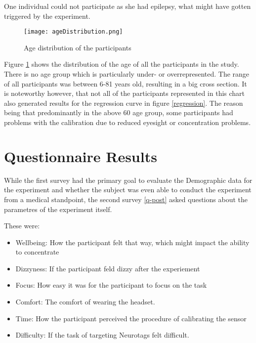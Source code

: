             One individual could not participate as she had epilepsy, what might have gotten triggered by the experiment.

            \begin{figure}[h]     %
                \centering
                \texttt{[image: ageDistribution.png]} 
                \caption{Age distribution of the participants}\label{age-dist}
            \end{figure}

            Figure \ref*{age-dist} shows the distribution of the age of all the participants in the study. There is no age group which is particularly under- or overrepresented. The range of all participants was between 6-81 years old, resulting in a big cross section. It is noteworthy however, that not all of the participants represented in this chart also generated results for the regression curve in figure \ref*{regression}. The reason being that predominantly in the above 60 age group, some participants had problems with the calibration due to reduced eyesight or concentration problems.
     
        \section{Questionnaire Results}

            While the first survey had the primary goal to evaluate the Demographic data for the experiment and whether the subject was even able to conduct the experiment from a medical standpoint, the second survey \ref*{q-post} asked questions about the parametres of the experiment itself.

            These were:

            \begin{itemize}
                \item Wellbeing: How the participant felt that way, which might impact the ability to concentrate
                \item Dizzyness: If the participant feld dizzy after the experiement
                \item Focus: How easy it was for the participant to focus on the task
                \item Comfort: The comfort of wearing the headset.
                \item Time: How the participant perceived the procedure of calibrating the sensor 
                \item Difficulty: If the task of targeting Neurotags felt difficult.
            \end{itemize}

